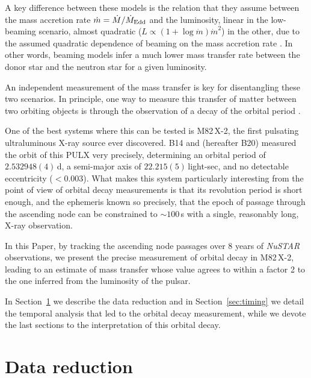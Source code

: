 \documentclass[twocolumn]{aastex631}
\newcommand{\nustar}{\textit{NuSTAR}\xspace}
\newcommand{\Mtwo}{M82\,X-2\xspace}
\newcommand{\Mdot}{\ensuremath{\dot{M}}}
\newcommand{\mdot}{\ensuremath{\dot{m}}}
\newcommand{\secref}{Section~\ref}
\begin{document}
A key difference between these models is the relation that they assume between the mass accretion rate $\mdot=\Mdot/\Mdot_{\rm Edd}$ and the luminosity, linear in the low-beaming scenario, almost quadratic ($L\propto(1 + \log \mdot) \mdot^2$) in the other, due to the assumed quadratic dependence of beaming on the mass accretion rate \citep{kingAccretionRatesBeaming2008}. In other words, beaming models infer a much lower mass transfer rate between the donor star and the neutron star for a given luminosity.

An independent measurement of the mass transfer is key for disentangling these two scenarios.
In principle, one way to measure this transfer of matter between two orbiting objects is through the observation of a decay of the orbital period \citep{taurisFormationEvolutionCompact2006}.

One of the best systems where this can be tested is \Mtwo, the first pulsating ultraluminous X-ray source ever discovered.
B14 and \citet{bachettiAllOnceTransient2020} (hereafter B20) measured the orbit of this PULX very precisely, determining an orbital period of $2.532948(4)$\,d, a semi-major axis of $22.215(5)$\,light-sec, and no detectable eccentricity ($<$0.003).
What makes this system particularly interesting from the point of view of orbital decay measurements is that its revolution period is short enough, and the ephemeris known so precisely, that the epoch of passage through the ascending node can be constrained to $\sim100$\,s with a single, reasonably long, X-ray observation.

In this Paper, by tracking the ascending node passages over 8 years of \nustar observations, we present the precise measurement of orbital decay in \Mtwo, leading to an estimate of mass transfer whose value agrees to within a factor 2 to the one inferred from the luminosity of the pulsar.

In \secref{sec:reduction} we describe the data reduction and in \secref{sec:timing} we detail the temporal analysis that led to the orbital decay measurement, while we devote the last sections to the interpretation of this orbital decay.

\section{Data reduction}\label{sec:reduction}
\end{document}
